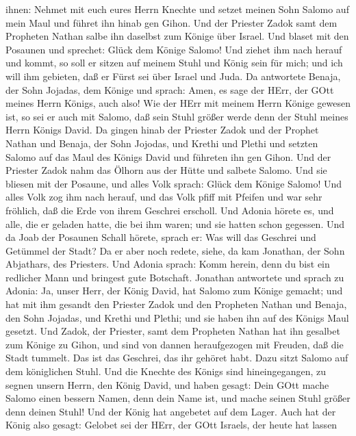 ihnen: Nehmet mit euch eures Herrn Knechte und setzet meinen Sohn Salomo
auf mein Maul und führet ihn hinab gen Gihon.  Und der
Priester Zadok samt dem Propheten Nathan salbe ihn daselbst zum Könige
über Israel. Und blaset mit den Posaunen und sprechet: Glück dem Könige
Salomo!  Und ziehet ihm nach herauf und kommt, so soll er
sitzen auf meinem Stuhl und König sein für mich; und ich will ihm
gebieten, daß er Fürst sei über Israel und Juda.  Da
antwortete Benaja, der Sohn Jojadas, dem Könige und sprach: Amen, es
sage der HErr, der GOtt meines Herrn Königs, auch also! 
Wie der HErr mit meinem Herrn Könige gewesen ist, so sei er auch mit
Salomo, daß sein Stuhl größer werde denn der Stuhl meines Herrn Königs
David.  Da gingen hinab der Priester Zadok und der Prophet
Nathan und Benaja, der Sohn Jojodas, und Krethi und Plethi und setzten
Salomo auf das Maul des Königs David und führeten ihn gen Gihon.
 Und der Priester Zadok nahm das Ölhorn aus der Hütte und
salbete Salomo. Und sie bliesen mit der Posaune, und alles Volk sprach:
Glück dem Könige Salomo!  Und alles Volk zog ihm nach
herauf, und das Volk pfiff mit Pfeifen und war sehr fröhlich, daß die
Erde von ihrem Geschrei erscholl.  Und Adonia hörete es,
und alle, die er geladen hatte, die bei ihm waren; und sie hatten schon
gegessen. Und da Joab der Posaunen Schall hörete, sprach er: Was will
das Geschrei und Getümmel der Stadt?  Da er aber noch
redete, siehe, da kam Jonathan, der Sohn Abjathars, des Priesters. Und
Adonia sprach: Komm herein, denn du bist ein redlicher Mann und bringest
gute Botschaft.  Jonathan antwortete und sprach zu Adonia:
Ja, unser Herr, der König David, hat Salomo zum Könige gemacht;
 und hat mit ihm gesandt den Priester Zadok und den
Propheten Nathan und Benaja, den Sohn Jojadas, und Krethi und Plethi;
und sie haben ihn auf des Königs Maul gesetzt.  Und Zadok,
der Priester, samt dem Propheten Nathan hat ihn gesalbet zum Könige zu
Gihon, und sind von dannen heraufgezogen mit Freuden, daß die Stadt
tummelt. Das ist das Geschrei, das ihr gehöret habt.  Dazu
sitzt Salomo auf dem königlichen Stuhl.  Und die Knechte
des Königs sind hineingegangen, zu segnen unsern Herrn, den König David,
und haben gesagt: Dein GOtt mache Salomo einen bessern Namen, denn dein
Name ist, und mache seinen Stuhl größer denn deinen Stuhl! Und der König
hat angebetet auf dem Lager.  Auch hat der König also
gesagt: Gelobet sei der HErr, der GOtt Israels, der heute hat lassen
